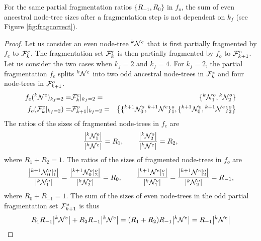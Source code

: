 \begin{lemma}\label{lem:sumevenkf}
  For the same partial fragmentation ratios $\{R_{-1}, R_0\}$ in $f_o$, the sum of even ancestral node-tree sizes after a fragmentation step is not dependent on $k_f$ (see Figure \ref{fig:fragcorrect}). 
\end{lemma}
\begin{proof}
  Let us consider an even node-tree ${}^{k}\mathcal{N}^e$ that is first partially fragmented by $f_e$ to $\mathcal{F}^e_k$. The fragmentation set $\mathcal{F}^e_k$ is then partially fragmented by $f_o$ to $\mathcal{F}_{k+1}^o$. Let us consider the two cases when $k_f=2$ and $k_f=4$. For $k_f=2$, the partial fragmentation $f_e$ splits ${}^{k}\mathcal{N}^e$ into two odd ancestral node-trees in $\mathcal{F}^e_k$ and four node-trees in $\mathcal{F}_{k+1}^o$.
  \begin{eqnarray*}
    f_e({}^{k}\mathcal{N}^e)_{k_f = 2} 
    =& \mathcal{F}^e_{k}|_{k_f = 2} 
    =& \{ {}^{k} \mathcal{N}^{o}_1, {}^{k} \mathcal{N}^{o}_2\}  \\
    f_o(\mathcal{F}^e_{k}|_{k_f = 2}) 
    =& \mathcal{F}^o_{k+1}|_{k_f = 2} 
    =& \left\{ \{{}^{k+1}\mathcal{N}^{o}_{0}, {}^{k+1}\mathcal{N}^{e}\}^o_1 , \{{}^{k+1}\mathcal{N}^{o}_{0}, {}^{k+1}\mathcal{N}^{e} \}^o_2 \right\}
  \end{eqnarray*}
  The ratios of the sizes of fragmented node-trees in $f_e$ are
  \begin{equation*}
    \frac{\abs{{}^{k} \mathcal{N}^{o}_1}}{\abs{{}^{k}\mathcal{N}^e}} = R_1, \hspace{2em}
    \frac{\abs{{}^{k} \mathcal{N}^{o}_2}}{\abs{{}^{k}\mathcal{N}^e}} = R_2, 
  \end{equation*}
  where $ R_1 + R_2 = 1$. The ratios of the sizes of fragmented node-trees in $f_o$ are
  \begin{equation*}
    \frac{\abs{{}^{k+1}\mathcal{N}^{o}_0|^o_1}}{\abs{{}^{k} \mathcal{N}^{o}_1}} = 
    \frac{\abs{{}^{k+1}\mathcal{N}^{o}_0|^o_2}}{\abs{{}^{k} \mathcal{N}^{o}_2}} = R_0, \hspace{2em}
    \frac{\abs{{}^{k+1}\mathcal{N}^{e}  |^o_1}}{\abs{{}^{k} \mathcal{N}^{o}_1}} = 
    \frac{\abs{{}^{k+1}\mathcal{N}^{e}  |^o_2}}{\abs{{}^{k} \mathcal{N}^{o}_2}} = R_{-1},  
  \end{equation*}
  where $R_0 + R_{-1} = 1$. The sum of the sizes of even node-trees in the odd partial fragmentation set $\mathcal{F}^o_{k+1}$ is thus
  \begin{equation*}
    R_1 R_{-1} \abs{{}^{k}\mathcal{N}^e} + R_2 R_{-1} \abs{{}^{k}\mathcal{N}^e} = (R_1 + R_2) R_{-1} \abs{{}^{k}\mathcal{N}^e} = R_{-1} \abs{{}^{k}\mathcal{N}^e}
  \end{equation*}


\end{proof}
